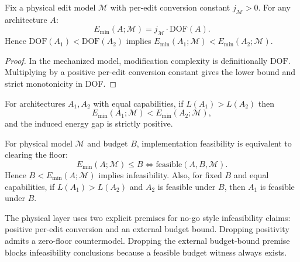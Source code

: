 \begin{theorem}\label{thm:physical-energy-floor}
Fix a physical edit model $\mathcal{M}$ with per-edit conversion constant $j_{\mathcal{M}}>0$. For any architecture $A$:
\[
E_{\min}(A;\mathcal{M}) = j_{\mathcal{M}}\cdot \mathrm{DOF}(A).
\]
Hence $\mathrm{DOF}(A_1) < \mathrm{DOF}(A_2)$ implies
$E_{\min}(A_1;\mathcal{M}) < E_{\min}(A_2;\mathcal{M})$.
\end{theorem}

\begin{proof}
In the mechanized model, modification complexity is definitionally $\mathrm{DOF}$. Multiplying by a positive per-edit conversion constant gives the lower bound and strict monotonicity in DOF.
\end{proof}

\begin{corollary}\label{cor:leverage-energy}
For architectures $A_1,A_2$ with equal capabilities, if $L(A_1)>L(A_2)$ then
\[
E_{\min}(A_1;\mathcal{M}) < E_{\min}(A_2;\mathcal{M}),
\]
and the induced energy gap is strictly positive.
\end{corollary}

\begin{theorem}\label{thm:physical-budget-boundary}
For physical model $\mathcal{M}$ and budget $B$, implementation feasibility is equivalent to clearing the floor:
\[
E_{\min}(A;\mathcal{M}) \le B \iff \text{feasible}(A,B,\mathcal{M}).
\]
Hence $B < E_{\min}(A;\mathcal{M})$ implies infeasibility. Also, for fixed $B$ and equal capabilities, if $L(A_1)>L(A_2)$ and $A_2$ is feasible under $B$, then $A_1$ is feasible under $B$.
\end{theorem}

\begin{corollary}\label{cor:physical-assumption-necessity}
The physical layer uses two explicit premises for no-go style infeasibility claims: positive per-edit conversion and an external budget bound. Dropping positivity admits a zero-floor countermodel. Dropping the external budget-bound premise blocks infeasibility conclusions because a feasible budget witness always exists.
\end{corollary}

